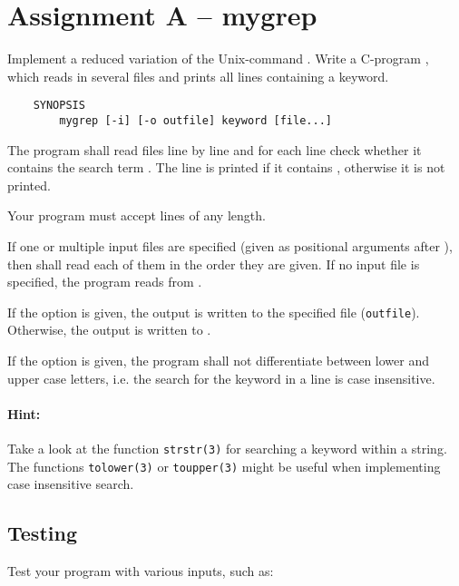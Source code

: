 




\section*{Assignment A -- mygrep}

Implement a reduced variation of the Unix-command .
Write a C-program ,
which reads in several files and prints all lines containing a keyword.

\begin{verbatim}
    SYNOPSIS
        mygrep [-i] [-o outfile] keyword [file...]
\end{verbatim}

The program  shall read files line by line
and for each line check whether it contains the search term .
The line is printed if it contains ,
otherwise it is not printed.

Your program must accept lines of any length.

If one or multiple input files are specified
(given as positional arguments after ),
then  shall read each of them in the order they are given.
If no input file is specified, the program reads from .

If the option  is given,
the output is written to the specified file (\verb|outfile|).
Otherwise, the output is written to .

If the option  is given,
the program shall not differentiate between lower and upper case letters,
i.e. the search for the keyword in a line is case insensitive.

\paragraph*{Hint:}
Take a look at the function \verb|strstr(3)|
for searching a keyword within a string.
The functions \verb|tolower(3)| or \verb|toupper(3)|
might be useful when implementing case insensitive search.

\subsection*{Testing}

Test your program with various inputs, such as:

